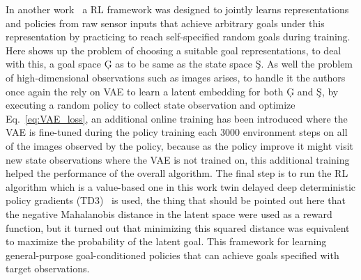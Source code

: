 In another work~\cite{nair2018visual} a RL framework was designed to jointly learns representations and policies from raw sensor inputs that achieve arbitrary goals under this representation by practicing to reach self-specified random goals during training. Here shows up the problem of choosing a suitable goal representations, to deal with this, a goal space \c{G} as to be same as the state space \c{S}. As well the problem of high-dimensional observations such as images arises, to handle it the authors once again the rely on VAE to learn a latent embedding for both \c{G} and \c{S}, by executing a random policy to collect state observation and optimize Eq.~\ref{eq:VAE_loss}, an additional online training has been introduced where the VAE is fine-tuned during the policy training each 3000 environment steps on all of the images observed by the policy, because as the policy improve it might visit new state observations where the VAE is not trained on, this additional training helped the performance of the overall algorithm. The final step is to run the RL algorithm which is a value-based one in this work twin delayed deep deterministic
policy gradients (TD3)~\cite{fujimoto2018addressing} is used, the thing that should be pointed out here that the negative Mahalanobis distance in the latent space were used as a reward function, but it turned out that minimizing this squared distance was equivalent to maximize the probability of the latent goal. This framework for learning general-purpose goal-conditioned policies that can achieve goals specified with target observations.\\




\clearpage{\pagestyle{empty}\cleardoublepage}